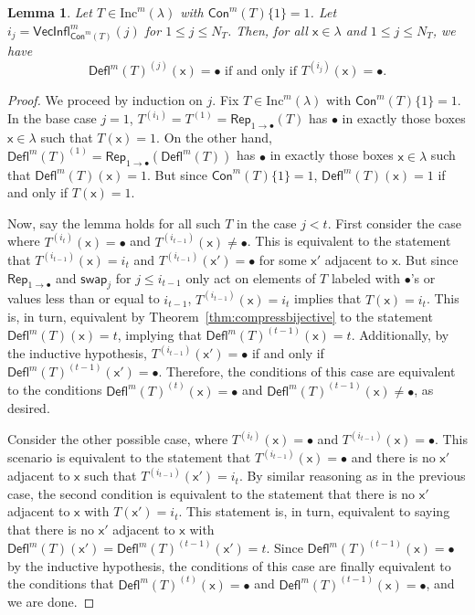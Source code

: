 \documentclass[12pt]{amsart}
\newcommand{\x}{\ensuremath{\mathsf{x}}}
\newtheorem{lemma}[theorem]{Lemma}
\theoremstyle{definition}
\theoremstyle{remark}
\numberwithin{equation}{section}
\newcommand{\inc}{\ensuremath{\mathrm{Inc}}}
\newcommand{\swap}{\ensuremath{\mathsf{swap}}}
\newcommand{\rep}{\ensuremath{\mathsf{Rep}}}
\newcommand{\deflate}{\ensuremath{\mathsf{Defl}}}
\newcommand{\inflate}{\ensuremath{\mathsf{VecInfl}}}
\newcommand{\content}{\ensuremath{\mathsf{Con}}}
\begin{document}
\begin{lemma} \label{lem:bullet_placement}
Let $T \in \inc^m(\lambda)$ with $\content^m(T) \lbrace 1 \rbrace = 1$. Let $i_j = \inflate^m_{\content^m(T)}(j)$ for $1 \leq j \leq N_T$. Then, for all $\x \in \lambda$ and $1 \leq j \leq N_T$, we have
 \begin{equation}\label{eq:gappy_promotion2}
\deflate^m(T)^{(j)}(\x) = \bullet \text{ if and only if } T^{(i_j)}(\x) = \bullet.
\end{equation}
\end{lemma}
\begin{proof} We proceed by induction on $j$. Fix $T \in \inc^m(\lambda)$  with $\content^m(T) \lbrace 1 \rbrace = 1$. In the base case $j = 1$,  $T^{(i_1)} = T^{(1)} = \rep_{1 \rightarrow \bullet}(T)$ has $\bullet$ in exactly those boxes $\x \in \lambda$ such that $T(\x) = 1$. On the other hand, $\deflate^m(T)^{(1)} =  \rep_{1 \rightarrow \bullet}(\deflate^m(T))$ has $\bullet$ in exactly those boxes $\x \in \lambda$ such that $\deflate^m(T)(\x) = 1$. But since $\content^m(T) \lbrace 1 \rbrace = 1$, $\deflate^m(T)(\x) = 1$ if and only if $T(\x) = 1$. 


Now, say the lemma holds for all such $T$ in the case $j < t$. First consider the case where $T^{(i_t)}(\x) = \bullet$ and $T^{(i_{t-1})}(\x) \neq \bullet$. This is equivalent to the statement that $T^{(i_{t-1})}(\x) = i_t$ and $T^{(i_{t-1})}(\x') = \bullet$ for some $\x'$ adjacent to $\x$. But since $\rep_{1 \rightarrow \bullet}$ and $\swap_j$ for  $j \leq i_{t-1}$ only act on elements of $T$ labeled with $\bullet$'s or values less than or equal to $i_{t-1}$, $T^{(i_{t-1})}(\x) = i_t$ implies that $T(\x) = i_t$. This is, in turn, equivalent by Theorem~\ref{thm:compressbijective} to the statement $\deflate^m(T)(\x) = t$, implying that $\deflate^m(T)^{(t-1)}(\x) = t$. Additionally, by the inductive hypothesis, $T^{(i_{t-1})}(\x') = \bullet$ if and only if $\deflate^m(T)^{(t-1)}(\x') = \bullet$. Therefore, the conditions of this case are equivalent to the conditions $\deflate^m(T)^{(t)}(\x) = \bullet$ and $\deflate^m(T)^{(t-1)}(\x) \neq \bullet$, as desired. 

Consider the other possible case, where $T^{(i_t)}(\x) = \bullet$ and $T^{(i_{t-1})}(\x) = \bullet$. This scenario is equivalent to the statement that $T^{(i_{t-1})}(\x) = \bullet$ and there is no $\x'$ adjacent to $\x$ such that $T^{(i_{t-1})}(\x') = i_t$. By similar reasoning as in the previous case, the second condition is equivalent to the statement that there is no $\x'$ adjacent to $\x$ with $T(\x') = i_t$. This statement is, in turn, equivalent to saying that there is no $\x'$ adjacent to $\x$ with $\deflate^m(T)(\x') = \deflate^m(T)^{(t-1)}(\x') = t$. Since $\deflate^m(T)^{(t-1)}(\x) = \bullet$ by the inductive hypothesis, the conditions of this case are finally equivalent to the conditions that $\deflate^m(T)^{(t)}(\x) = \bullet$ and $\deflate^m(T)^{(t-1)}(\x) = \bullet$, and we are done.
\end{proof}
\end{document}
